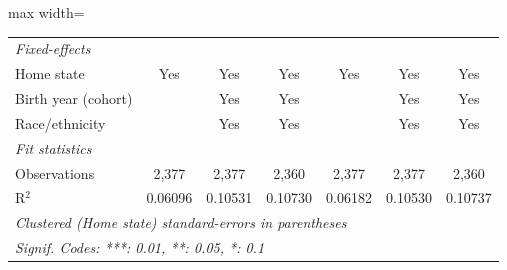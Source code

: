 \begin{adjustbox}{max width=\linewidth}
\begin{tabular}{lcccccc}
      \midrule
      \emph{Fixed-effects}\\
      Home state                               & Yes           & Yes           & Yes          & Yes           & Yes           & Yes\\  
      Birth year (cohort)                      &               & Yes           & Yes          &               & Yes           & Yes\\  
      Race/ethnicity                           &               & Yes           & Yes          &               & Yes           & Yes\\  
      \midrule
      \emph{Fit statistics}\\
      Observations                             & 2,377         & 2,377         & 2,360        & 2,377         & 2,377         & 2,360\\  
      R$^2$                                    & 0.06096       & 0.10531       & 0.10730      & 0.06182       & 0.10530       & 0.10737\\  
      \midrule \midrule
      \multicolumn{7}{l}{\emph{Clustered (Home state) standard-errors in parentheses}}\\
      \multicolumn{7}{l}{\emph{Signif. Codes: ***: 0.01, **: 0.05, *: 0.1}}\\
   \end{tabular}
      \end{adjustbox}
\vspace{3pt}\par{}
